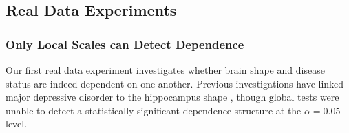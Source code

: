 \documentclass[11pt]{article}
\providecommand{\sct}[1]{{\sc \texttt{#1}}}
\newcommand{\subfigimg}[3][,]{%
  \setbox1=\hbox{\texttt{[image: \#3]}}%
  \leavevmode\rlap{\usebox1}%
  \rlap{\hspace*{12pt}\raisebox{\dimexpr\ht1-0\baselineskip}{#2}}%
  \phantom{\usebox1}%
}
\newcommand{\Mgc}{\sct{Mgc}}
\newcommand{\Mcorr}{\sct{Mcorr}}
\begin{document}

\subsection*{Real Data Experiments}
\label{numer3}

\subsubsection*{Only Local Scales can Detect Dependence} %

Our first real data experiment investigates whether brain shape and disease status are indeed dependent on one another.  Previous investigations have linked major depressive disorder to the hippocampus shape \cite{ParkEtAl2008,PosenerEtAl2003}, though global tests were unable to detect a statistically significant dependence structure at the $\alpha=0.05$ level.
\end{document}
